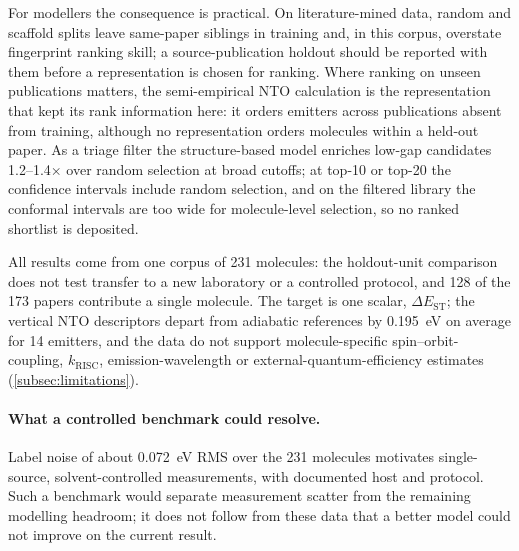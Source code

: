 For modellers the consequence is practical. On literature-mined data, random and
scaffold splits leave same-paper siblings in training and, in this corpus, overstate
fingerprint ranking skill; a source-publication holdout should be reported with them
before a representation is chosen for ranking. Where ranking on unseen publications
matters, the semi-empirical NTO calculation is the representation that kept its rank
information here: it orders emitters across publications absent from training,
although no representation orders molecules within a held-out paper. As a triage filter the structure-based model enriches low-gap
candidates \numrange{1.2}{1.4}$\times$ over random selection at broad cutoffs; at
top-10 or top-20 the confidence intervals include random selection, and on the
filtered library the conformal intervals are too wide for molecule-level selection,
so no ranked shortlist is deposited.

All results come from one corpus of \num{231} molecules: the holdout-unit comparison
does not test transfer to a new laboratory or a controlled protocol, and
\num{128} of the \num{173} papers contribute a single molecule. The target is one
scalar, $\Delta E_\text{ST}$; the vertical NTO descriptors depart from adiabatic
references by \qty{0.195}{\electronvolt} on average for \num{14} emitters, and the
data do not support molecule-specific spin--orbit-coupling, $k_\text{RISC}$,
emission-wavelength or external-quantum-efficiency estimates
(\cref{subsec:limitations}).

\paragraph{What a controlled benchmark could resolve.}
Label noise of about \qty{0.072}{\electronvolt} RMS over the \num{231} molecules motivates
single-source, solvent-controlled measurements, with documented host and
protocol. Such a benchmark would separate measurement scatter from the
remaining modelling headroom; it does not follow from these data that a
better model could not improve on the current result.
